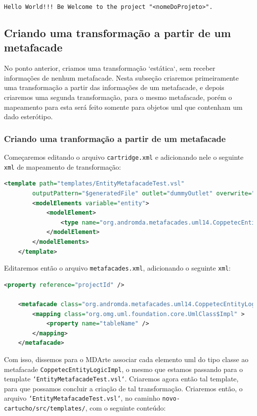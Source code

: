 \texttt{Hello World!!! Be Welcome to the project "<nomeDoProjeto>".}

\subsection{Criando uma transformação a partir de um metafacade}
No ponto anterior, criamos uma transformação `estática`, sem receber informações
de nenhum metafacade. Nesta subseção criaremos primeiramente uma transformação a
partir das informações de um metafacade, e depois criaremos uma segunda
transformação, para o mesmo metafacade, porém o mapeamento para esta será feito
somente para objetos uml que contenham um dado esterótipo.

\subsubsection{Criando uma tranformação a partir de um metafacade}
Começaremos editando o arquivo \texttt{cartridge.xml} e adicionando nele o
seguinte \texttt{xml} de mapeamento de transformação:

\begin{lstlisting}[language=xml,
frame=single]
	<template path="templates/EntityMetafacadeTest.vsl"
		outputPattern="$generatedFile" outlet="dummyOutlet" overwrite="true">
		<modelElements variable="entity">
            <modelElement>
                <type name="org.andromda.metafacades.uml14.CoppetecEntityLogicImpl" />
            </modelElement>
        </modelElements>
	</template>
\end{lstlisting}

Editaremos então o arquivo \texttt{metafacades.xml}, adicionando o seguinte
\texttt{xml}:

\begin{lstlisting}[language=xml,
frame=single]
    <property reference="projectId" />
	
    <metafacade class="org.andromda.metafacades.uml14.CoppetecEntityLogicImpl">
        <mapping class="org.omg.uml.foundation.core.UmlClass$Impl" >
        	<property name="tableName" />
        </mapping>
    </metafacade>
\end{lstlisting}

Com isso, dissemos para o MDArte associar cada elemento uml do tipo classe ao
metafacade \texttt{CoppetecEntityLogicImpl}, o mesmo que estamos passando para o
template \texttt{`EntityMetafacadeTest.vsl`}. Criaremos agora então tal
template, para que possamos concluir a criação de tal transformação. Criaremos
então, o arquivo \texttt{`EntityMetafacadeTest.vsl`}, no caminho
\texttt{novo-cartucho/src/templates/}, com o seguinte conteúdo:

